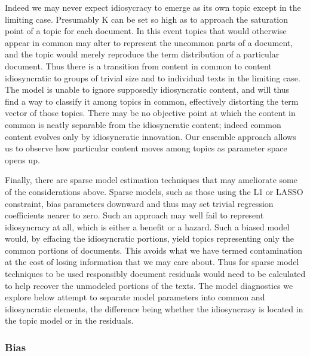 \documentclass[]{book}
\theoremstyle{definition}
\theoremstyle{definition}
\theoremstyle{definition}
\theoremstyle{remark}
\begin{document}
Indeed we may never expect idiosycracy to emerge as its own topic except
in the limiting case. Presumably K can be set so high as to approach the
saturation point of a topic for each document. In this event topics that
would otherwise appear in common may alter to represent the uncommon
parts of a document, and the topic would merely reproduce the term
distribution of a particular document. Thus there is a transition from
content in common to content idiosyncratic to groups of trivial size and
to individual texts in the limiting case. The model is unable to ignore
supposedly idiosyncratic content, and will thus find a way to classify
it among topics in common, effectively distorting the term vector of
those topics. There may be no objective point at which the content in
common is neatly separable from the idiosyncratic content; indeed common
content evolves only by idiosyncratic innovation. Our ensemble approach
allows us to observe how particular content moves among topics as
parameter space opens up.

Finally, there are sparse model estimation techniques that may
ameliorate some of the considerations above. Sparse models, such as
those using the L1 or LASSO constraint, bias parameters downward and
thus may set trivial regression coefficients nearer to zero. Such an
approach may well fail to represent idiosyncracy at all, which is either
a benefit or a hazard. Such a biased model would, by effacing the
idiosyncratic portions, yield topics representing only the common
portions of documents. This avoids what we have termed contamination at
the cost of losing information that we may care about. Thus for sparse
model techniques to be used responsibly document residuals would need to
be calculated to help recover the unmodeled portions of the texts. The
model diagnostics we explore below attempt to separate model parameters
into common and idiosyncratic elements, the difference being whether the
idiosyncrasy is located in the topic model or in the residuals.

\hypertarget{bias}{%
\subsubsection{Bias}\label{bias}}
\end{document}
